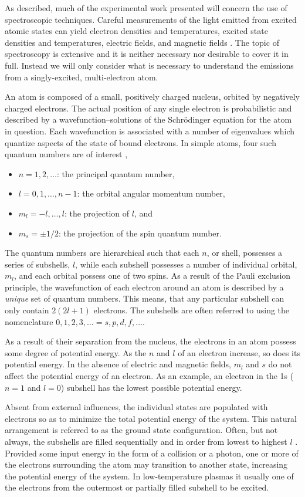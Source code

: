 As described, much of the experimental work presented will concern the use of
spectroscopic techniques. Careful measurements of the light emitted from excited
atomic states can yield electron densities and temperatures, excited state
densities and temperatures, electric fields, and magnetic fields
\cite{Griem2005}. The topic of spectroscopy is extensive and it is neither
necessary nor desirable to cover it in full. Instead we will only consider what
is necessary to understand the emissions from a singly-excited, multi-electron
atom.

An atom is composed of a small, positively charged nucleus, orbited by
negatively charged electrons. The actual position of any single electron is
probabilistic and described by a wavefunction--solutions of the Schr\"{o}dinger
equation for the atom in question. Each wavefunction is associated with a number
of eigenvalues which quantize aspects of the state of bound electrons. In simple
atoms, four such quantum numbers are of interest \cite{Drake2006},
\begin{itemize}
  \item $n=1,2,\ldots$: the principal quantum number,
  \item $l=0,1,\ldots,n-1$: the orbital angular momentum number,
  \item $m_l =-l,\ldots,l$: the projection of $l$, and
  \item $m_s=\pm1/2$: the projection of the spin quantum number.
\end{itemize}
The quantum numbers are hierarchical such that each $n$, or shell, possesses a
series of subshells, $l$, while each subshell possesses a number of individual
orbital, $m_l$, and each orbital possess one of two spins. As a result of the
Pauli exclusion principle, the wavefunction of each electron around an atom is
described by a \emph{unique} set of quantum numbers. This means, that any
particular subshell can only contain $2(2l+1)$ electrons. The subshells are
often referred to using the nomenclature $0,1,2,3,\ldots = s,p,d,f,\ldots$.

As a result of their separation from the nucleus, the electrons in an atom
possess some degree of potential energy. As the $n$ and $l$ of an electron
increase, so does its potential energy. In the absence of electric and magnetic
fields, $m_l$ and $s$ do not affect the potential energy of an electron. As an
example, an electron in the 1s ($n=1$ and $l=0$) subshell has the lowest
possible potential energy.

Absent from external influences, the individual states are populated with
electrons so as to minimize the total potential energy of the system. This
natural arrangement is referred to as the ground state configuration. Often, but
not always, the subshells are filled sequentially and in order from lowest to
highest $l$ \cite{Drake2006}. Provided some input energy in the form of a
collision or a photon, one or more of the electrons surrounding the atom may
transition to another state, increasing the potential energy of the system. In
low-temperature plasmas it usually one of the electrons from the outermost or
partially filled subshell to be excited.

